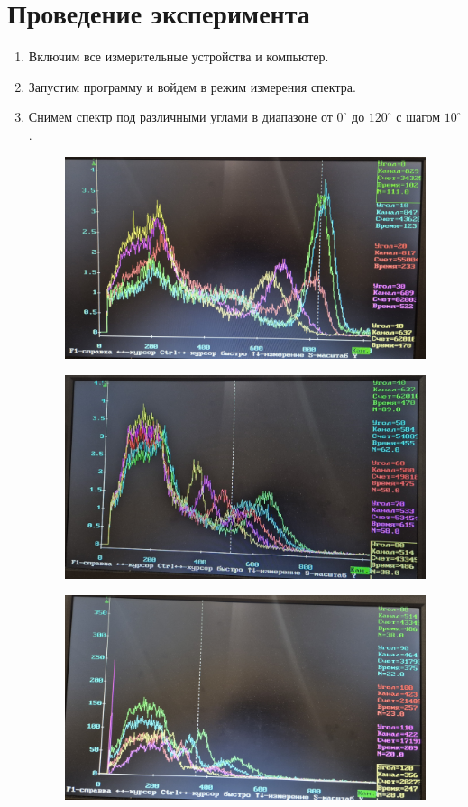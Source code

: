 \documentclass[14pt, a4paper]{report}
\begin{document}
\section{Проведение эксперимента}

\begin{enumerate}

\item Включим все измерительные устройства и компьютер.

\item Запустим программу и войдем в режим измерения спектра.

\item Снимем спектр под различными углами в диапазоне от $0^\circ$ до $120^\circ$ с шагом $10^\circ$.

\newpage

\begin{figure}[H]
\centering
\includegraphics[width=0.85\linewidth]{../images/512-3}
\end{figure}

\begin{figure}[H]
\centering
\includegraphics[width=0.85\linewidth]{../images/512-4}
\end{figure}

\begin{figure}[H]
\centering
\includegraphics[width=0.85\linewidth]{../images/512-5}
\end{figure}


\end{enumerate}
\end{document}
